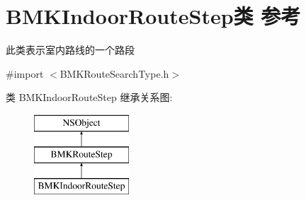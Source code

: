 \hypertarget{interface_b_m_k_indoor_route_step}{}\section{B\+M\+K\+Indoor\+Route\+Step类 参考}
\label{interface_b_m_k_indoor_route_step}


此类表示室内路线的一个路段  




{\ttfamily \#import $<$B\+M\+K\+Route\+Search\+Type.\+h$>$}

类 B\+M\+K\+Indoor\+Route\+Step 继承关系图\+:\begin{figure}[H]
\begin{center}
\leavevmode
\includegraphics[height=3.000000cm]{interface_b_m_k_indoor_route_step}
\end{center}
\end{figure}
